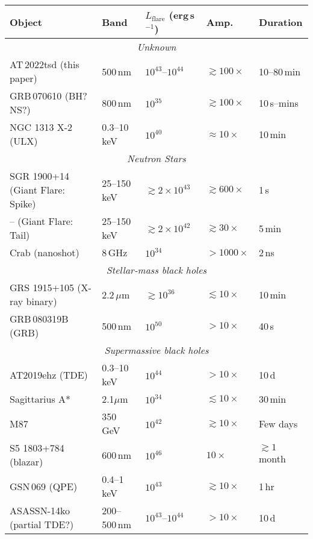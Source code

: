 \documentclass{nature_plusfigure}
\begin{document}
\begin{table}
    \centering
    \begin{tabular}{lllll}
    \hline\hline
     Object & Band & $L_\mathrm{flare}$ (erg\,s$^{-1}$) & Amp. & Duration \\
     \hline
     \multicolumn{5}{c}{\emph{Unknown}}\\
    AT\,2022tsd (this paper) & 500\,nm & $10^{43}$--$10^{44}$ & $\gtrsim100\times$ & 10--80\,min \\
    GRB\,070610 (BH?\cite{Kasliwal2008} NS?\cite{CastroTirado2008,Stefanescu2008}) & 800\,nm & $10^{35}$ & $\gtrsim100\times$ & 10\,s--mins \\
     NGC 1313 X-2 (ULX) & 0.3--10\,keV\cite{Mucciarelli2007} & $10^{40}$ & $\approx10\times$ & 10\,min \\
     \multicolumn{5}{c}{\emph{Neutron Stars}}\\
    SGR 1900+14\cite{Hurley1999} (Giant Flare: Spike) & 25--150\,keV & $\gtrsim2\times10^{43}$ & $\gtrsim600\times$ & 1\,s \\
    -- (Giant Flare: Tail) & 25--150\,keV & $\gtrsim2\times10^{42}$ & $\gtrsim30\times$ & 5\,min \\
    Crab (nanoshot) & 8\,GHz\cite{Hankins2003} & $10^{34}$ & $>1000\times$ & 2\,ns \\
     \multicolumn{5}{c}{\emph{Stellar-mass black holes}}\\
    GRS 1915+105 (X-ray binary) & 2.2\,$\mu$m\cite{Fender1997} & $\gtrsim10^{36}$ & $\lesssim 10\times$ & 10\,min \\
    GRB\,080319B  (GRB) & 500\,nm\cite{Racusin2008} & $10^{50}$ & $>10\times$ & 40\,s \\
     \multicolumn{5}{c}{\emph{Supermassive black holes}}\\
    AT2019ehz (TDE) & 0.3--10\,keV\cite{vanVelzen2021} & $10^{44}$ & $>10\times$ & 10\,d \\  
    Sagittarius A* & 2.1$\mu$m\cite{Marrone2008} & $10^{34}$ & $\lesssim 10\times$ & 30\,min \\
    M87 & 350\,GeV\cite{Abramowski2012} & $10^{42}$ & $\gtrsim10\times$ & Few days \\
    S5 1803+784 (blazar) & 600\,nm\cite{Nesci2021} & $10^{46}$ & $10\times$ & $\gtrsim1\,$month \\
    GSN\,069 (QPE) & 0.4--1\,keV\cite{Miniutti2023} & $10^{43}$ & $\gtrsim10\times$ & 1\,hr \\
    ASASSN-14ko (partial TDE?) & 200--500\,nm\cite{Payne2022} & $10^{43}$--$10^{44}$ & $>10\times$ & 10\,d \\

\end{tabular}
\end{table}
\end{document}
